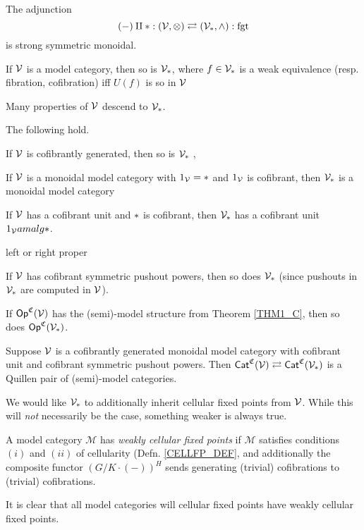 \documentclass[a4paper,10pt
,draft
]{article}%
\renewcommand{\1}{\eta}%
\begin{document}
\begin{lemma}
      The adjunction
      \[
            (-) \amalg \**: (\V,\otimes) \rightleftarrows (\V_{\**}, \wedge) : \mathrm{fgt}
      \]
      is strong symmetric monoidal.

      If $\mathcal V$ is a model category, then so is $\V_{\**}$, where $f \in \V_{\**}$ is a weak equivalence (resp. fibration, cofibration) iff
      $U(f)$ is so in $\mathcal V$ %
\end{lemma}

Many properties of $\mathcal V$ descend to $\V_{\**}$. 

\begin{lemma}
      \label{PT_PROP_LEM}
      The following hold. 
      \begin{enumerate*}[label = (\roman*)]
      \item If $\mathcal V$ is cofibrantly generated, then so is $\V_{\**}$ \cite[Lemma 2.1.21]{Hov99},
      \item If $\mathcal V$ is a monoidal model category with $1_\V = \**$ and $1_{\mathcal V}$ is cofibrant, then $\V_{\**}$ is a monoidal model category \cite[Lemma 4.2.9]{Hov99}
      \item If $\mathcal V$ has a cofibrant unit and $\**$ is cofibrant, then $\V_{\**}$ has a cofibrant unit $1_\V amalg \**$.
      \item left or right proper \cite{Hir}
      \item If $\mathcal V$ has cofibrant symmetric pushout powers, then so does $\V_{\**}$ (since pushouts in $\V_{\**}$ are computed in $\mathcal V$).
      \end{enumerate*}
\end{lemma}

\begin{corollary}
      If $\mathsf{Op}^{\mathfrak C}(\mathcal V)$ has the (semi)-model structure from Theorem \ref{THM1_C}, then so does $\Op^{\mathfrak C}(\V_{\**})$.     
\end{corollary}

\begin{lemma}
      Suppose $\mathcal V$ is a cofibrantly generated monoidal model category with cofibrant unit and cofibrant symmetric pushout powers.
      Then
      $\Cat^{\mathfrak C}(\V) \rightleftarrows \Cat^{\mathfrak C}(\V_{\**})$ is a Quillen pair of (semi)-model categories.
\end{lemma}

We would like $\V_{\**}$ to additionally inherit cellular fixed points from $\mathcal V$.
While this will \textit{not} necessarily be the case, something weaker is always true.
\begin{definition}
      A model category $\mathcal M$ has \textit{weakly cellular fixed points} if
      $\mathcal M$ satisfies conditions $(i)$ and $(ii)$ of cellularity (Defn. \ref{CELLFP_DEF},
      and additionally the composite functor $(G/K \cdot (-))^H$ sends generating (trivial) cofibrations to (trivial) cofibrations.

      It is clear that all model categories will cellular fixed points have weakly cellular fixed points.
\end{definition}
\end{document}

